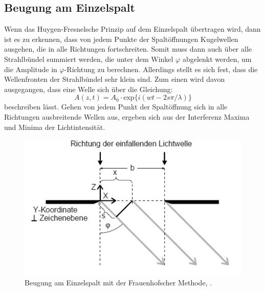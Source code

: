 \subsection{Beugung am Einzelspalt}
Wenn das Huygen-Fresnelsche Prinzip auf dem Einzelspalt übertragen wird, dann ist es zu erkennen, dass von jedem Punkte der Spaltöffnungen Kugelwellen ausgehen, die in alle Richtungen fortschreiten. Somit muss dann auch über alle Strahlbündel summiert werden, die unter dem Winkel $\varphi$ abgelenkt werden, um die Amplitude in $\varphi$-Richtung zu berechnen. Allerdings stellt es sich fest, dass die Wellenfronten der Strahlbündel sehr klein sind. Zum einen wird davon ausgegangen, dass eine Welle sich über die Gleichung:
\begin{equation*}
A(z,t) = A_0 \cdot \text{exp}\{i(wt-2s\pi/\lambda)\}
\end{equation*}
beschreiben lässt. Gehen von jedem Punkt der Spaltöffnung sich in alle Richtungen ausbreitende Wellen aus, ergeben sich aus der Interferenz Maxima und Minima der Lichtintensität.

\begin{figure}[h!]
	\centering
	\includegraphics[width=0.9\linewidth]{BeugungamEinzelspalt.jpg}
	\caption{Beugung am Einzelspalt mit der Frauenhofscher Methode, \cite[3]{anleitung406}.}
	\label{fig:beugungameinzelspalt}
\end{figure}

